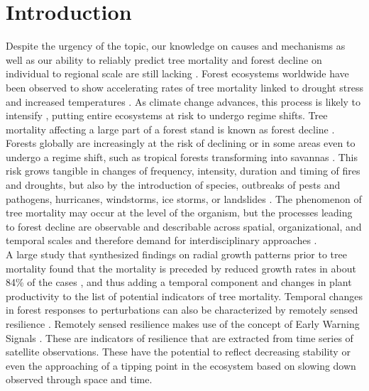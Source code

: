 \section{Introduction}\label{sec:intro}
Despite the urgency of the topic, our knowledge on causes and mechanisms as well as our ability to reliably predict tree mortality and forest decline on individual to regional scale are still lacking \citep{mcdowell2013, hartmann2015}. Forest ecosystems worldwide have been observed to show accelerating rates of tree mortality linked to drought stress and increased temperatures \citep{allen2010, chaparro2017, vanmantgen2009}. As climate change advances, this process is likely to intensify \citep{allen2015}, putting entire ecosystems at risk to undergo regime shifts. Tree mortality affecting a large part of a forest stand is known as forest decline \citep{martinez2012}. Forests globally are increasingly at the risk of declining \citep{choat2012} or in some areas even to undergo a regime shift, such as tropical forests transforming into savannas \citep{hirota2011}. This risk grows tangible in changes of frequency, intensity, duration and timing of fires and droughts, but also by the introduction of species, outbreaks of pests and pathogens, hurricanes, windstorms, ice storms, or landslides \citep{dale2001}. The phenomenon of tree mortality may occur at the level of the organism, but the processes leading to forest decline are observable and describable across spatial, organizational, and temporal scales and therefore demand for interdisciplinary approaches \citep{hartmann2015}.\\
A large study that synthesized findings on radial growth patterns prior to tree mortality found that the mortality is preceded by reduced growth rates in about 84\% of the cases \citep{cailleret2017}, and thus adding a temporal component and changes in plant productivity to the list of potential indicators of tree mortality. Temporal changes in forest responses to perturbations can also be characterized by remotely sensed \gls{resilience} \citep{verbesselt2016}. Remotely sensed \gls{resilience} makes use of the concept of Early Warning Signals \citep[EWS,][]{carpenter2006, carpenter2008, dakos2008}. These are indicators of resilience that are extracted from time series of satellite observations. These have the potential to reflect decreasing stability \citep{kefi2013} or even the approaching of a tipping point in the ecosystem \citep{scheffer2009b} based on slowing down observed through space and time.\\
